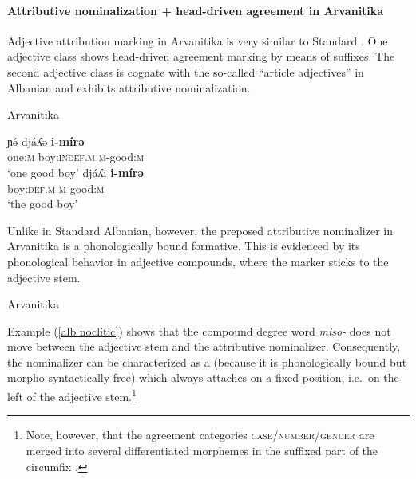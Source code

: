 \paragraph*{Attributive nominalization + head\hyp{}driven agreement in Arvanitika}
Adjective attribution marking in Arvanitika is very similar to Standard . One adjective class shows head\hyp{}driven agreement marking by means of suffixes. The second adjective class is cognate with the so-called “article adjectives” in Albanian and exhibits attributive nominalization. 
\begin{exe}
\ex \rm{Arvanitika \citep[303]{sasse1991}}
\begin{xlist}
\ex
\gll	ɲə́ 			djáʎə 			\textbf{i-mírə}\\
	one:\textsc{m} 	boy:\textsc{indef.m} 	\textsc{m}-good:\textsc{m}\\
\glt	‘one good boy’
\ex
\gll				djáʎi 				\textbf{i-mírə}\\
				boy:\textsc{def.m} 	\textsc{m}-good:\textsc{m}\\
\glt	‘the good boy’
\end{xlist}
\end{exe}
Unlike in Standard Albanian, however, the preposed attributive nominalizer in Arvanitika is a phonologically bound formative. This is evidenced by its phonological behavior in adjective compounds, where the marker sticks to the adjective stem.
\begin{exe}
\label{alb noclitic}
\ex \rm{Arvanitika \citep[304]{sasse1991}}
\begin{xlist}
\end{xlist}
\end{exe}
Example (\ref{alb noclitic}) shows that the compound degree word \textit{miso-} does not move between the adjective stem and the attributive nominalizer. Consequently, the nominalizer can be characterized as a  (because it is phonologically bound but morpho-syntactically free) which always attaches on a fixed position, i.e.~on the left of the adjective stem.\footnote{Note, however, that the agreement categories \textsc{case/number/gender} are merged into several differentiated morphemes in the suffixed part of the circumfix \cite[124–128]{sasse1991}.}

